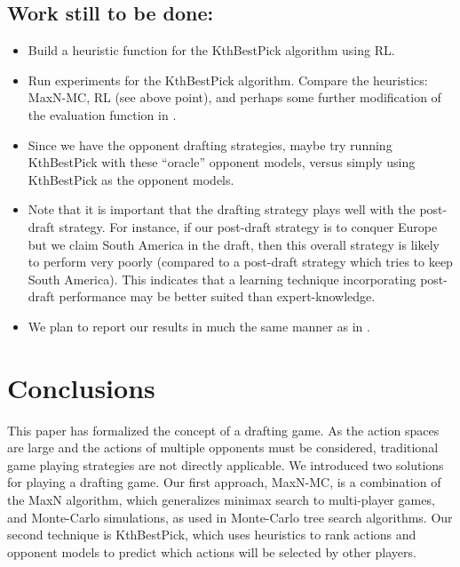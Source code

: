 \documentclass[letterpaper]{article}
\numberwithin{equation}{section}
\numberwithin{theorem}{section}
\numberwithin{lemma}{section}
\numberwithin{df}{section}
\begin{document}
\subsection{Work still to be done:}

\begin{itemize}
	\item Build a heuristic function for the KthBestPick algorithm using RL.
	\item Run experiments for the KthBestPick algorithm.  Compare the heuristics: MaxN-MC, RL (see above point), and perhaps some further modification of the evaluation function in \cite{RiskBots}.
	\item Since we have the opponent drafting strategies, maybe try running KthBestPick with these ``oracle'' opponent models, versus simply using KthBestPick as the opponent models.
	\item Note that it is important that the drafting strategy plays well with the post-draft strategy.  For instance, if our post-draft strategy is to conquer Europe but we claim South America in the draft, then this overall strategy is likely to perform very poorly (compared to a post-draft strategy which tries to keep South America).  This indicates that a learning technique incorporating post-draft performance may be better suited than expert-knowledge.
	\item We plan to report our results in much the same manner as in \cite{ZuckFelnerKraus2009}.
\end{itemize} 


\section{Conclusions}


This paper has formalized the concept of a drafting game.  As the action spaces are large and the actions of multiple opponents must be considered, traditional game playing strategies are not directly applicable.  We introduced two solutions for playing a drafting game.  Our first approach, MaxN-MC, is a combination of the MaxN algorithm, which generalizes minimax search to multi-player games, and Monte-Carlo simulations, as used in Monte-Carlo tree search algorithms.  Our second technique is KthBestPick, which uses heuristics to rank actions and opponent models to predict which actions will be selected by other players.  
\end{document}
